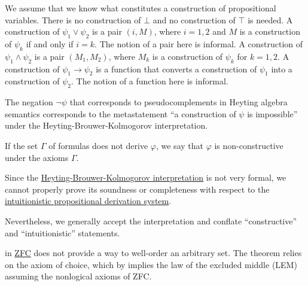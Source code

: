 \begin{proposition}
\begin{proposition}
\begin{definition}
  \begin{thmenum}
     We assume that we know what constitutes a construction of propositional variables.
     There is no construction of \( \bot \) and no construction of \( \top \) is needed.
     A construction of \( \psi_1 \vee \psi_2 \) is a pair \( (i, M) \), where \( i = 1, 2 \) and \( M \) is a construction of \( \psi_k \) if and only if \( i = k \). The notion of a pair here is informal.
     A construction of \( \psi_1 \wedge \psi_2 \) is a pair \( (M_1, M_2) \), where \( M_k \) is a construction of \( \psi_k \) for \( k = 1, 2 \).
     A construction of \( \psi_1 \rightarrow \psi_2 \) is a function that converts a construction of \( \psi_1 \) into a construction of \( \psi_2 \). The notion of a function here is informal.
  \end{thmenum}

  The negation \( \neg\psi \) that corresponds to pseudocomplements in Heyting algebra semantics corresponds to the metastatement \enquote{a construction of \( \psi \) is impossible} under the Heyting-Brouwer-Kolmogorov interpretation.

  If the set \( \Gamma \) of formulas does not derive \( \varphi \), we say that \( \varphi \) is non-constructive under the axioms \( \Gamma \).
\end{definition}

\begin{remark}\label{rem:brouwer_heyting_kolmogorov_interpretation_compatibility}
  Since the \hyperref[def:brouwer_heyting_kolmogorov_interpretation]{Heyting-Brouwer-Kolmogorov interpretation} is not very formal, we cannot properly prove its soundness or completeness with respect to the \hyperref[def:intuitionistic_propositional_derivation_system]{intuitionistic propositional derivation system}.

  Nevertheless, we generally accept the interpretation and conflate \enquote{constructive} and \enquote{intuitionistic} statements.
\end{remark}

\begin{example}\label{ex:def:brouwer_heyting_kolmogorov_interpretation/well_ordering_principle_zfc}
   in \hyperref[def:set]{ZFC} does not provide a way to well-order an arbitrary set. The theorem relies on the axiom of choice, which by  implies the law of the excluded middle (LEM) assuming the nonlogical axioms of ZFC.


\end{example}
\end{proposition}
\end{proposition}
